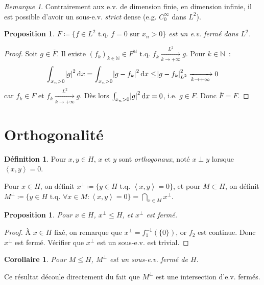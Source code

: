 \documentclass{report}
\newcommand{\N}{{\mathbb N}}
\newcommand{\scpr}[2]{\left\langle#1, #2\right\rangle}
\newcommand{\tq}{\text{ t.q. }}
\newcommand{\pinfty}{{+\infty}}
\newcommand{\dx}{\dif x}
\newtheorem{prp}[thm]{Proposition}
\newtheorem{cor}[thm]{Corollaire}
\theoremstyle{definition}
\newtheorem{déf}[thm]{Définition}
\theoremstyle{remark}
\newtheorem*{rmq}{Remarque}
\begin{document}
\begin{rmq} Contrairement aux e.v. de dimension finie, en dimension infinie, il est possible d'avoir un sous-e.v. \textit{strict} dense (e.g. $C^\infty_0$ dans $L^2$).
\end{rmq}

\begin{prp} $F \coloneqq \{f \in L^2 \tq f=0 \text{ sur } x_n > 0\}$ est un e.v. fermé dans $L^2$.
\end{prp}

\begin{proof} Soit $g \in \overline F$. Il existe $(f_k)_{k \in \N} \in F^\N \tq f_k \xrightarrow[k \to \pinfty]{L^2} g$. Pour $k \in \N$~:
\[\int_{x_n > 0}\abs g^2\dx = \int_{x_n > 0}\abs {g-f_k}^2\dx \leq \abs {g-f_k}^2_{L^2} \xrightarrow[k \to \pinfty]{} 0\]
car $f_k \in F$ et $f_k \xrightarrow[k \to \pinfty]{L^2} g$. Dès lors $\int_{x_n > 0}\abs g^2\dx = 0$, i.e. $g \in F$. Donc $\overline F = F$.
\end{proof}

\section{Orthogonalité}

\begin{déf} Pour $x, y \in H$, $x$ et $y$ sont \textit{orthogonaux}, noté $x \perp y$ lorsque $\scpr xy = 0$.

Pour $x \in H$, on définit $x^\perp \coloneqq \{y \in H \tq \scpr xy = 0\}$, et pour $M \subset H$, on définit
$M^\perp \coloneqq \{y \in H \tq \forall x \in M : \scpr xy = 0\} = \bigcap_{x \in M}x^\perp$.
\end{déf}

\begin{prp} Pour $x \in H$, $x^\perp \leq H$, et $x^\perp$ est fermé.
\end{prp}

\begin{proof} À $x \in H$ fixé, on remarque que $x^\perp = f_1^{-1}(\{0\})$, or $f_2$ est continue. Donc $x^\perp$ est fermé. Vérifier que $x^\perp$ est un sous-e.v. est trivial.
\end{proof}

\begin{cor} Pour $M \leq H$, $M^\perp$ est un sous-e.v. fermé de $H$.
\end{cor}

Ce résultat découle directement du fait que $M^\perp$ est une intersection d'e.v. fermés.
\end{document}
